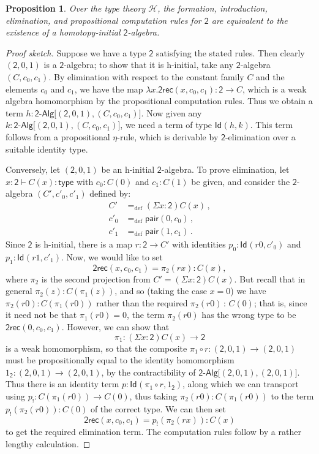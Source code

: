 \documentclass{article}
\newcommand{\defeq}{=_{\mathrm{def}}}
\newcommand{\type}{\mathsf{type}}
\newcommand{\Id}{\mathsf{Id}}
\newcommand{\id}[1]{\Id_{#1}}
\newcommand{\Bool}{\mathsf{2}}
\newcommand{\boolrec}{\mathsf{2rec}}
\newcommand{\pair}{\mathsf{pair}}
\newcommand{\BoolAlg}{\mathsf{2}\text{-}\mathsf{Alg}}
\newcommand{\Hint}{\mathcal{H}}
\newtheorem{proposition}[theorem]{Proposition}
\theoremstyle{remark}
\theoremstyle{definition}
\begin{document}
\begin{proposition} \label{prop:2hinitial}
Over the type theory $\Hint$, the formation, introduction, elimination, and propositional computation rules
for $\Bool$ are equivalent to the existence of a homotopy-initial $\Bool$-algebra.
\end{proposition}
\begin{proof}[Proof sketch] 
Suppose we have a type $\Bool$ satisfying the stated rules.  Then clearly $(\Bool, 0, 1)$ is a $\Bool$-algebra; to show that it is h-initial, take any $\Bool$-algebra $(C,c_0,c_1)$.  By elimination with respect to the constant family $C$ and the elements $c_0$ and $c_1$, we have the map $\lambda x . \boolrec(x, c_0,c_1) : \Bool \rightarrow C$, which is a weak algebra homomorphism by the propositional computation rules.  Thus we obtain a term $h:\BoolAlg\big[ (\Bool, 0, 1), (C, c_0,c_1)\big]$.  Now given any $k:\BoolAlg\big[ (\Bool, 0, 1), (C, c_0,c_1)\big]$, we need a term of type $\id{}(h,k)$.  This term follows from a propositional $\eta$-rule, which is derivable by $\Bool$-elimination over a suitable identity type.

Conversely, let $(\Bool, 0, 1)$ be an h-initial $\Bool$-algebra.  To prove elimination, let $x:\Bool \vdash C(x):\type$ with $c_0 : C(0)$ and $ c_1 : C(1)$ be given, and consider the $\Bool$-algebra $(C', c'_0, c'_1)$ defined by:
%
\begin{align*}
C' &\defeq (\Sigma x: \Bool)C(x) \, , \\
c'_0 &\defeq \pair(0, c_0) \, , \\
c'_1 &\defeq \pair(1, c_1)\, .
\end{align*}
%
Since $\Bool$ is h-initial, there is a map $r : \Bool\rightarrow C'$ with identities $p_0:\id{}(r  0, c'_0)$ and $p_1:\id{}(r  1, c'_1)$.  Now, we would like to set 
$$\boolrec(x, c_0, c_1) = \pi_2 (r x) : C(x),$$
 where $\pi_2$ is the second projection from $C'=(\Sigma x: \Bool)C(x)$.  But recall that in general 
 $\pi_2(z) : C(\pi_1(z))$, and so (taking the case $x=0$) we have $\pi_2(r   0) : C(\pi_1(r   0))$ rather than the required $\pi_2(r   0) {\, : \, } C(0)$; that is, since it need not be that $\pi_1(r   0) = 0$, the term $\pi_2(r   0)$ has the wrong type to be $\boolrec(0, c_0, c_1)$.  However, we can show that $$\pi_1: (\Sigma x: \Bool)C(x)\rightarrow \Bool$$ is a weak homomorphism, so that the composite $\pi_1\circ r : (\Bool, 0, 1)\rightarrow (\Bool, 0, 1)$ must be propositionally equal to the identity homomorphism $1_\Bool : (\Bool, 0, 1)\rightarrow (\Bool, 0, 1)$, by the contractibility of $\BoolAlg \big[ (\Bool, 0, 1), (\Bool, 0, 1)\big]$.  Thus there is an identity term $p : \id{}(\pi_1\circ r, 1_\Bool)$, along which we can transport using $p_! : C(\pi_1( r   0)) \rightarrow C(0)$, thus taking $\pi_2(r   0 ) : C(\pi_1 (r   0))$ to the term  $p_! ( \pi_2( r   0) ) :C(0)$ of the correct type.  We can then set
\[
\boolrec(x, c_0, c_1) = p_! (\pi_2 (r x)) : C(x)
\]
to get the required elimination term.  The computation rules follow by a rather lengthy calculation.
\end{proof}
\end{document}

